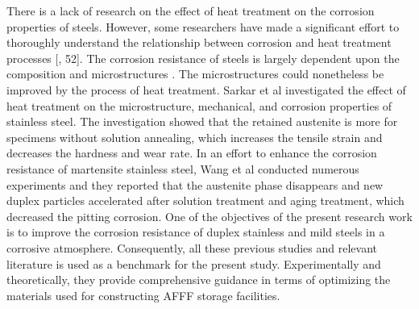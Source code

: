 \documentclass[12pt]{report}
\begin{document}
There is a lack of research on the effect of heat treatment on the corrosion properties of steels. However, some researchers have made a significant effort to thoroughly understand the relationship between corrosion and heat treatment processes [\cite{whitman1924effect}, 52]. The corrosion resistance of steels is largely dependent upon the composition and microstructures \cite{wang2020enhancing}. The microstructures could nonetheless be improved by the process of heat treatment. Sarkar et al \cite{sarkar2020effects} investigated the effect of heat treatment on the microstructure, mechanical, and corrosion properties of stainless steel. The investigation showed that the retained austenite is more for specimens without solution annealing, which increases the tensile strain and decreases the hardness and wear rate. In an effort to enhance the corrosion resistance of martensite stainless steel, Wang et al \cite{wang2020enhancing} conducted numerous experiments and they reported that the austenite phase disappears and new duplex particles accelerated after solution treatment and aging treatment, which decreased the pitting corrosion. 
One of the objectives of the present research work is to improve the corrosion resistance of duplex stainless and mild steels in a corrosive atmosphere. Consequently, all these previous studies and relevant literature is used as a benchmark for the present study. Experimentally and theoretically, they provide comprehensive guidance in terms of optimizing the materials used for constructing AFFF storage facilities.
\end{document}
